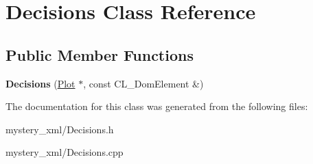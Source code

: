\hypertarget{classDecisions}{
\section{Decisions Class Reference}
\label{classDecisions}
}
\subsection*{Public Member Functions}
\begin{DoxyCompactItemize}
\item 
\hypertarget{classDecisions_a8c89d9f293fd2a70a4c1509a60986382}{
{\bfseries Decisions} (\hyperlink{classPlot}{Plot} $\ast$, const CL\_\-DomElement \&)}
\label{classDecisions_a8c89d9f293fd2a70a4c1509a60986382}

\end{DoxyCompactItemize}


The documentation for this class was generated from the following files:\begin{DoxyCompactItemize}
\item 
mystery\_\-xml/Decisions.h\item 
mystery\_\-xml/Decisions.cpp\end{DoxyCompactItemize}

